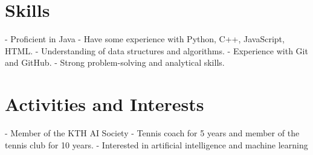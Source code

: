 \documentclass{article}
\begin{document}
\section*{Skills}
- Proficient in Java
- Have some experience with Python, C++, JavaScript, HTML.
- Understanding of data structures and algorithms.
- Experience with Git and GitHub.
- Strong problem-solving and analytical skills.

\section*{Activities and Interests}
- Member of the KTH AI Society
- Tennis coach for 5 years and member of the tennis club for 10 years.
- Interested in artificial intelligence and machine learning
\end{document}
